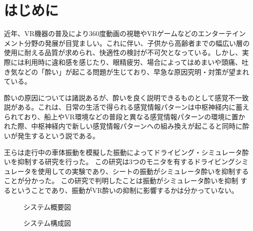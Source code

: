 \documentclass[uplatex]{jsarticle}
\begin{document}
\vspace{3mm}

\setcounter{page}{9}

\section{はじめに}
近年、VR機器の普及により360度動画の視聴やVRゲームなどのエンターテインメント分野の発展が目覚ましい。これに伴い、子供から高齢者までの幅広い層の使用に耐える品質が求められ、快適性の検討が不可欠となっている。しかし、実際には利用時に違和感を感じたり、眼精疲労、場合によってはめまいや頭痛、吐き気などの「酔い」が起こる問題が生じており、早急な原因究明・対策が望まれている。

酔いの原因については諸説あるが、酔いを良く説明できるものとして感覚不一致説\cite{SensoryConflictTheory}がある。これは、日常の生活で得られる感覚情報パターンは中枢神経内に蓄えられており、船上やVR環境などの普段と異なる感覚情報パターンの環境に置かれた際、中枢神経内で新しい感覚情報パターンへの組み換えが起こると同時に酔いが発生するという説である。

王らは走行中の車体振動を模擬した振動によってドライビング・シミュレータ酔いを抑制する研究を行った\cite{driving_vive}。
この研究は3つのモニタを有するドライビングシミュレータを使用しての実験であり、シートの振動がシミュレータ酔いを抑制することが分かった。
この研究で判明したことは振動がシミュレータ酔いを抑制
するということであり、振動がVR酔いの抑制に影響するかは分かっていない。

\begin{figure}[tb]
  \centering
  \caption{システム概要図}
  \label{fig:about_system}
  \caption{システム構成図}
  \label{fig:system_str}
\end{figure}
\end{document}
